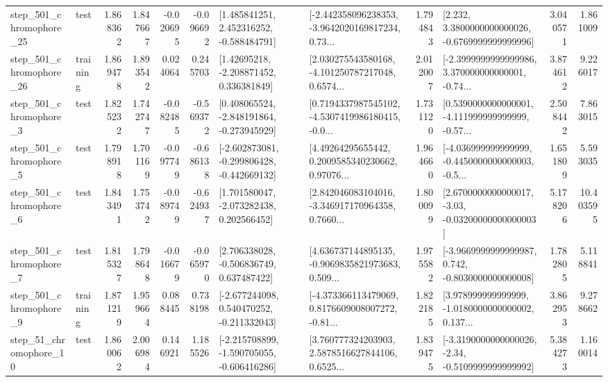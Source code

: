 \begin{tabular}{llrrrrllrlrr}
  step\_501\_chromophore\_25 &      test &      1.868362 &    1.847667 &     -0.020695 & -0.096692 &    [1.485841251, 2.452316252, -0.588484791] &  [-2.442358096238353, -3.9642020169817234, 0.73... &       1.794843 &   [2.232, 3.3800000000000026, -0.6769999999999996] &            3.040571 &          1.861009 \\
  step\_501\_chromophore\_26 &  training &      1.869478 &    1.893542 &      0.024064 &  0.245703 &     [1.42695218, -2.208871452, 0.336381849] &  [2.030275543580168, -4.101250787217048, 0.6574... &       2.012007 &  [-2.3999999999999986, 3.370000000000001, -0.74... &            3.874612 &          9.226017 \\
   step\_501\_chromophore\_3 &      test &      1.825232 &    1.742747 &     -0.082485 & -0.569372 &   [0.408065524, -2.848191864, -0.273945929] &  [0.7194337987545102, -4.5307419986180415, -0.0... &       1.731120 &  [0.5390000000000001, -4.111999999999999, -0.57... &            2.508442 &          7.863015 \\
   step\_501\_chromophore\_5 &      test &      1.798918 &    1.701169 &     -0.097749 & -0.686138 &  [-2.602873081, -0.299806428, -0.442669132] &  [4.49264295655442, 0.2009585340230662, 0.97076... &       1.964660 &  [-4.036999999999999, -0.4450000000000003, -0.5... &            1.651809 &          5.593035 \\
   step\_501\_chromophore\_6 &      test &      1.843491 &    1.753742 &     -0.089749 & -0.624937 &    [1.701580047, -2.073282438, 0.202566452] &  [2.842046083104016, -3.346917170964358, 0.7660... &       1.800099 &  [2.6700000000000017, -3.03, -0.03200000000000003] &            5.178206 &         10.403595 \\
   step\_501\_chromophore\_7 &      test &      1.815327 &    1.798648 &     -0.016679 & -0.065970 &    [2.706338028, -0.506836749, 0.637487422] &  [4.636737144895135, -0.9069835821973683, 0.509... &       1.975582 &  [-3.9669999999999987, 0.742, -0.8030000000000008] &            1.782805 &          5.118841 \\
   step\_501\_chromophore\_9 &  training &      1.871219 &    1.959664 &      0.088445 &  0.738198 &   [-2.677244098, 0.540470252, -0.211332043] &  [-4.373366113479069, 0.8176609008007272, -0.81... &       1.822185 &  [3.978999999999999, -1.0180000000000002, 0.137... &            3.862953 &          9.278662 \\
   step\_51\_chromophore\_10 &      test &      1.860062 &    2.006984 &      0.146921 &  1.185526 &  [-2.215708899, -1.590705055, -0.606416286] &  [3.760777324203903, 2.5878516627844106, 0.6525... &       1.839475 &  [-3.3190000000000026, -2.34, -0.5109999999999992] &            5.384273 &          1.160014 \\

\end{tabular}

